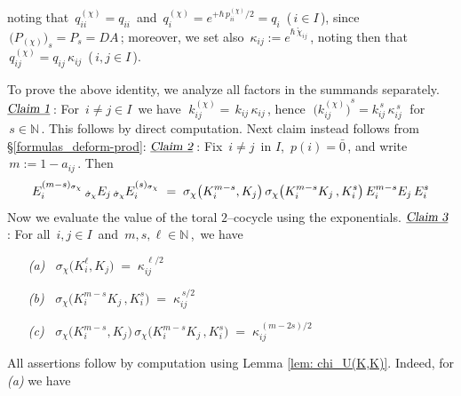 \documentclass[12pt,reqno,twoside,a4paper]{amsart}
\numberwithin{equation}{section}
\theoremstyle{definition}
\newtheorem{free text}[lema]{}
\theoremstyle{remark}
\newcommand{\zero}{{\bar{0}}}
\def \NN{\mathbb{N}}
\theoremstyle{plain}
\begin{document}
%
 noting that  $ \, q_{ii}^{(\chi)} = q_{ii} \, $  and  $ \, q_i^{(\chi)} = e^{+\hbar\,p_{i{}i}^{(\chi)}/2} = q_i \, $  ($ \, i \in I \, $),  since  $ \, \big(P_{(\chi)}\big)_{s} = P_s = DA \, $;  moreover, we set also  $ \, \kappa_{ij} := e^{\hbar \, \mathring{\chi}_{ij}} \, $,  noting then that  $ \, q_{ij}^{(\chi)} = q_{ij}\,\kappa_{ij} \, $  ($ \, i , j \in I \, $).
                                                                   \par
   To prove the above identity, we analyze all factors in the summands separately.
%
 \vskip9pt
%
\noindent
%
%
 $ \underline{\text{\sl Claim 1}} \, $:  For  $ \, i \neq j \in I \, $  we have
%
  $ \; k_{ij}^{(\chi)} = \,  k_{ij} \, \kappa_{ij} \, $,
%
 \;hence  $ \; {\big( k_{ij}^{(\chi)} \big)}^{\!s} \! =  k_{ij}^{\,s} \, \kappa_{ij}^{\,s} \; $  for  $ \, s \in \NN \, $.
%
 \vskip9pt
%
   This follows by direct computation.  Next claim instead follows from  \S \ref{formulas_deform-prod}:
%
 \vskip9pt
%
\noindent
%
 $ \underline{\text{\sl Claim 2}} \, $:  Fix  $ \, i \neq j \, $  in  $ I $,  $ \, p(i) = \zero \, $,  and write  $ \, m := 1-a_{ij} \, $.  Then
%
  $$  E_i^{(m-s)_{\sigma_{\chi}}} \raise-1pt\hbox{$ \, \scriptstyle \dot\sigma_\chi $}
  E_j \raise-1pt\hbox{$ \, \scriptstyle \dot\sigma_\chi $} E_i^{(s)_{\sigma_{\chi}}}  \;
  = \; \sigma_\chi\big( K_i^{m-s} , K_j \big) \, \sigma_\chi\big( K_i^{m-s} K_j \, , K_i^s \big) \, E_i^{m-s} E_j \, E_i^s  $$
%
 \vskip3pt
%
   Now we evaluate the value of the toral  $ 2 $--cocycle  using the exponentials.
%
 \vskip9pt
%
\noindent
 $ \underline{\text{\sl Claim 3}} \, $:  For all  $ \, i , j \in I \, $  and  $ \, m, s, \ell \in \NN \, $,  \,we have
%
 \vskip7pt
%
\begin{enumerate}
  \item[\textit{(a)}]  $ \;\; \sigma_\chi\big( K_i^\ell , K_j \big)  \; = \;  \kappa_{ij}^{\,\ell/2} $
  \item[\textit{(b)}]  $ \;\; \sigma_\chi\big( K_i^{m-s} K_j \, , K_i^s \big)  \; = \;  \kappa_{ij}^{\,s/2} $
  \item[\textit{(c)}]  $ \;\; \sigma_\chi\big( K_i^{m-s} , K_j \big) \,
  \sigma_\chi\big( K_i^{m-s} K_j \, , K_i^s \big)  \; = \;  \kappa_{ij}^{\,(m-2s)/2} $
%
\end{enumerate}
%
 \vskip7pt
%
\noindent
 All assertions follow by computation using  Lemma \ref{lem: chi_U(K,K)}. Indeed, for   \textit{(a)\/}  we have
\end{document}
